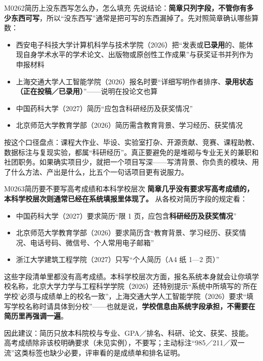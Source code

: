 \begin{qa}{M0262}{简历上没东西写怎么办，怎么填充}
先说结论：\textbf{简章只列字段，不管你有多少东西可写}，所以“没东西写”通常是把可写的东西漏掉了。先对照简章确认哪些算数：

\begin{itemize}
  \item 西安电子科技大学计算机科学与技术学院（2026）把“发表或\textbf{已录用}的、能体现自身学术水平的学术论文、出版物或原创性工作成果”与获奖证书并列作为申报材料
  \item 上海交通大学人工智能学院（2026）报名时要“详细写明作者排序、\textbf{录用状态（正在投稿／已录用）}”——说明在投论文也算
  \item 中国药科大学（2027）简历“应包含科研经历及获奖情况”
  \item 北京师范大学教育学部（2026）简历需含教育背景、学习经历、获奖情况
\end{itemize}

按这个口径盘点：课程大作业、毕设、实验室打杂、开源贡献、竞赛、课程助教、数据标注与复现实验，都属“科研经历”。真正要避免的是堆砌与专业无关的兼职和社团职务。如果确实项目少，就把一个项目写深——写清背景、你负责的模块、用了什么方法、产出是什么，比五个一句话项目更有说服力。
\end{qa}

\begin{qa}{M0263}{简历要不要写高考成绩和本科学校层次}
\textbf{简章几乎没有要求写高考成绩的，本科学校层次则通常已经在系统填报里体现了。} 从各校对简历字段的规定看：

\begin{itemize}
  \item 中国药科大学（2027）要求简历“限 1 页，应包含\textbf{科研经历及获奖情况}”
  \item 北京师范大学教育学部（2026）要求简历含“教育背景、学习经历、获奖情况、电话号码、微信号、个人常用电子邮箱”
  \item 浙江大学建筑工程学院（2027）只写“个人简历（A4 纸 1—2 页）”
\end{itemize}

这些字段清单里都没有高考成绩。本科学校层次方面，报名系统本身就会让你填学校名称，北京大学力学与工程科学学院（2026）还特别提示“系统中所填写的'所在学校'必须与成绩单上的校名一致”，上海交通大学人工智能学院（2026）要求“填写学校名称时请具体到分校”——也就是说，\textbf{学校信息由系统字段承担，不需要在简历里再强调一遍}。

因此建议：简历只放本科院校与专业、GPA／排名、科研、论文、获奖、技能。高考成绩除非该校明确要求（未见实例），不要写；主动标注“985／211／双一流”这类标签也缺少必要，评审看的是成绩单和排名证明。
\end{qa}


